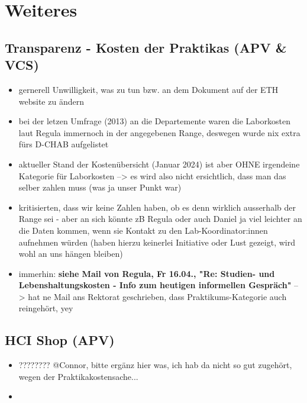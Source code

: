 \documentclass{article}
\begin{document}
\section{Weiteres}
\subsection{Transparenz - Kosten der Praktikas (APV \& VCS)}
\begin{itemize}
    \item gernerell Unwilligkeit, was zu tun bzw. an dem Dokument auf der ETH website zu ändern
    \item bei der letzen Umfrage (2013) an die Departemente waren die Laborkosten laut Regula immernoch in der angegebenen Range, deswegen wurde nix extra fürs D-CHAB aufgelistet
    \item aktueller Stand der Kostenübersicht (Januar 2024) ist aber OHNE irgendeine Kategorie für Laborkosten --> es wird also nicht ersichtlich, dass man das selber zahlen muss (was ja unser Punkt war)
    \item kritisierten, dass wir keine Zahlen haben, ob es denn wirklich ausserhalb der Range sei - aber an sich könnte zB Regula oder auch Daniel ja viel leichter an die Daten kommen, wenn sie Kontakt zu den Lab-Koordinator:innen aufnehmen würden (haben hierzu keinerlei Initiative oder Lust gezeigt, wird wohl an uns hängen bleiben)
    \item immerhin: \textbf{siehe Mail von Regula, Fr 16.04., "Re: Studien- und Lebenshaltungskosten - Info zum heutigen informellen Gespräch"} --> hat ne Mail ans Rektorat geschrieben, dass Praktikums-Kategorie auch reingehört, yey
\end{itemize}

\subsection{HCI Shop (APV)}
\begin{itemize}
    \item ???????? @Connor, bitte ergänz hier was, ich hab da nicht so gut zugehört, wegen der Praktikakostensache...
    \item
\end{itemize}
\end{document}
